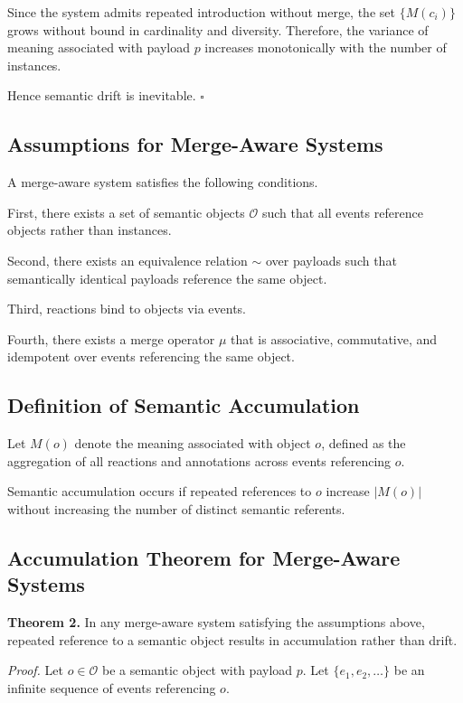 \documentclass[11pt,oneside]{article}
\begin{document}
Since the system admits repeated introduction without merge, the set $\{M(c_i)\}$ grows without bound in cardinality and diversity. Therefore, the variance of meaning associated with payload $p$ increases monotonically with the number of instances.

Hence semantic drift is inevitable. \hfill $\square$

\subsection{Assumptions for Merge-Aware Systems}

A merge-aware system satisfies the following conditions.

First, there exists a set of semantic objects $\mathcal{O}$ such that all events reference objects rather than instances.

Second, there exists an equivalence relation $\sim$ over payloads such that semantically identical payloads reference the same object.

Third, reactions bind to objects via events.

Fourth, there exists a merge operator $\mu$ that is associative, commutative, and idempotent over events referencing the same object.

\subsection{Definition of Semantic Accumulation}

Let $M(o)$ denote the meaning associated with object $o$, defined as the aggregation of all reactions and annotations across events referencing $o$.

Semantic accumulation occurs if repeated references to $o$ increase $|M(o)|$ without increasing the number of distinct semantic referents.

\subsection{Accumulation Theorem for Merge-Aware Systems}

\textbf{Theorem 2.}  
In any merge-aware system satisfying the assumptions above, repeated reference to a semantic object results in accumulation rather than drift.

\emph{Proof.}  
Let $o \in \mathcal{O}$ be a semantic object with payload $p$. Let $\{e_1, e_2, \dots\}$ be an infinite sequence of events referencing $o$.
\end{document}
